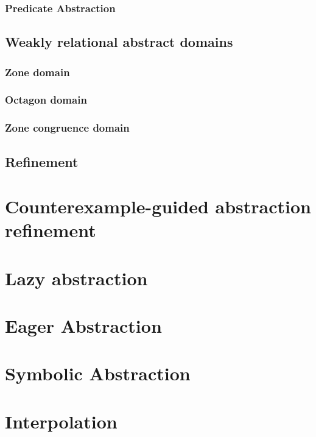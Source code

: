 \subsubsection{Predicate Abstraction}

\subsection{Weakly relational abstract domains}

\subsubsection{Zone domain}

\subsubsection{Octagon domain}

\subsubsection{Zone congruence domain}

\subsection{Refinement}

\section{Counterexample-guided abstraction refinement}



\section{Lazy abstraction}

\section{Eager Abstraction}

\section{Symbolic Abstraction}

\section{Interpolation}

